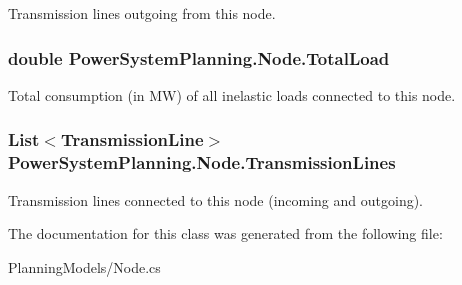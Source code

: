 Transmission lines outgoing from this node. 

\subsubsection[{\texorpdfstring{Total\+Load}{TotalLoad}}]{\setlength{\rightskip}{0pt plus 5cm}double Power\+System\+Planning.\+Node.\+Total\+Load\hspace{0.3cm}{\ttfamily [get]}}\hypertarget{class_power_system_planning_1_1_node_a5ad80ac9ed391e904c9cf4011c7ba00d}{}\label{class_power_system_planning_1_1_node_a5ad80ac9ed391e904c9cf4011c7ba00d}


Total consumption (in MW) of all inelastic loads connected to this node. 

\subsubsection[{\texorpdfstring{Transmission\+Lines}{TransmissionLines}}]{\setlength{\rightskip}{0pt plus 5cm}List$<${\bf Transmission\+Line}$>$ Power\+System\+Planning.\+Node.\+Transmission\+Lines\hspace{0.3cm}{\ttfamily [get]}}\hypertarget{class_power_system_planning_1_1_node_a99a60d0b8c6efda899676fd86417162f}{}\label{class_power_system_planning_1_1_node_a99a60d0b8c6efda899676fd86417162f}


Transmission lines connected to this node (incoming and outgoing). 



The documentation for this class was generated from the following file\+:\begin{DoxyCompactItemize}
\item 
Planning\+Models/Node.\+cs\end{DoxyCompactItemize}
